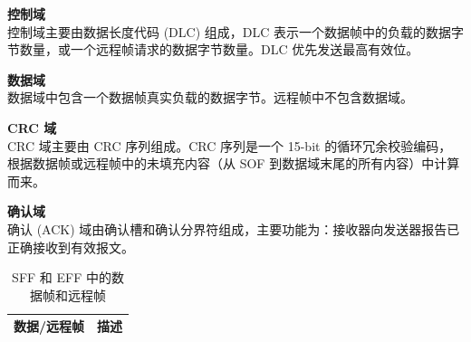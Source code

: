 \documentclass[main\_\_CN.tex]{subfiles}
\begin{document}
{\bfseries 控制域}\\
控制域主要由数据长度代码 (DLC) 组成，DLC 表示一个数据帧中的负载的数据字节数量，或一个远程帧请求的数据字节数量。DLC 优先发送最高有效位。

{\bfseries 数据域}\\
数据域中包含一个数据帧真实负载的数据字节。远程帧中不包含数据域。

{\bfseries CRC 域}\\
CRC 域主要由 CRC 序列组成。CRC 序列是一个 15-bit 的循环冗余校验编码，根据数据帧或远程帧中的未填充内容（从 SOF 到数据域末尾的所有内容）中计算而来。

{\bfseries 确认域}\\
确认 (ACK) 域由确认槽和确认分界符组成，主要功能为：接收器向发送器报告已正确接收到有效报文。

\begin{longtable}[c]{|p{3.5cm}|p{12cm}|}

  \caption{SFF 和 EFF 中的数据帧和远程帧}
  \label{table:Data Frames and Remote Frames}
  \\\hline
  \rowcolor{lightgray}
  {数据/远程帧} & {描述}
  \\\hline
  \endfirsthead


\end{longtable}
\end{document}
